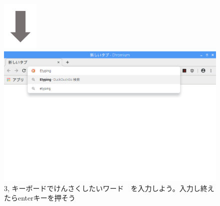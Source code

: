 \documentclass[a4paper,12pt]{jarticle}
\begin{document}
\begin{figure}[t]
  \hfill\begin{minipage}{0.45\textwidth}
    {\centering
      \includegraphics[width=1.707cm]{textbook-img074.png}
    }\\
    \includegraphics[width=\linewidth]{textbook-img072.png}
    3,
    キーボードでけんさくしたいワード　を入力しよう。入力し終えたらenterキーを押そう
  \end{minipage}

  \vspace{70mm}

\end{figure}
\clearpage
\end{document}
